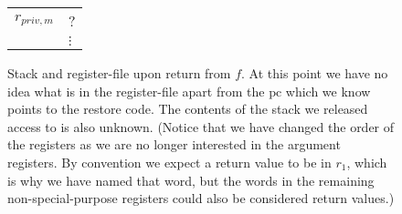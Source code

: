 \documentclass[a4paper]{article}
\newcommand{\var}[1]{\mathit{#1}}
\newcommand{\pcreg}{\mathrm{pc}}
\begin{document}
\begin{figure}
\begin{tabular}{r | >{\centering\arraybackslash}p{0.75cm} |}
                  \cline{2-2}
                  $r_{\var{priv},m}$ & ? \\
                  \cline{2-2}
                           & $\vdots$ \\
                  \cline{2-2}
                \end{tabular}
                \caption{ Stack and register-file upon return from $f$. At this point we have no idea what is in the register-file apart from the $\pcreg$ which we know points to the restore code. The contents of the stack we released access to is also unknown. (Notice that we have changed the order of the registers as we are no longer interested in the argument registers. By convention we expect a return value to be in $r_1$, which is why we have named that word, but the words in the remaining non-special-purpose registers could also be considered return values.)}
              \end{figure}
\end{document}
